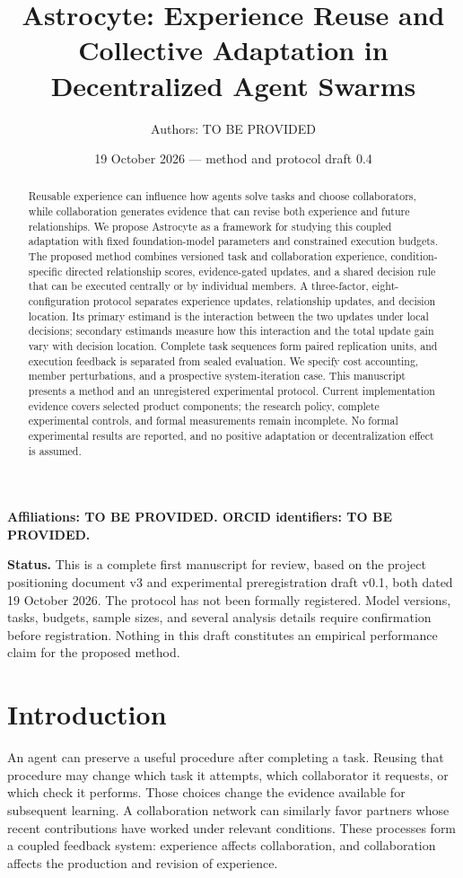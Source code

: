 \documentclass[
  english,
  11pt,
]{article}
\title{Astrocyte: Experience Reuse and Collective Adaptation in
Decentralized Agent Swarms}
\author{Authors: TO BE PROVIDED}
\date{19 October 2026 --- method and protocol draft 0.4}
\begin{document}
\maketitle
\begin{abstract}
Reusable experience can influence how agents solve tasks and choose
collaborators, while collaboration generates evidence that can revise
both experience and future relationships. We propose Astrocyte as a
framework for studying this coupled adaptation with fixed
foundation-model parameters and constrained execution budgets. The
proposed method combines versioned task and collaboration experience,
condition-specific directed relationship scores, evidence-gated updates,
and a shared decision rule that can be executed centrally or by
individual members. A three-factor, eight-configuration protocol
separates experience updates, relationship updates, and decision
location. Its primary estimand is the interaction between the two
updates under local decisions; secondary estimands measure how this
interaction and the total update gain vary with decision location.
Complete task sequences form paired replication units, and execution
feedback is separated from sealed evaluation. We specify cost
accounting, member perturbations, and a prospective system-iteration
case. This manuscript presents a method and an unregistered experimental
protocol. Current implementation evidence covers selected product
components; the research policy, complete experimental controls, and
formal measurements remain incomplete. No formal experimental results
are reported, and no positive adaptation or decentralization effect is
assumed.
\end{abstract}

\textbf{Affiliations: TO BE PROVIDED. ORCID identifiers: TO BE
PROVIDED.}

\textbf{Status.} This is a complete first manuscript for review, based
on the project positioning document v3 and experimental preregistration
draft v0.1, both dated 19 October 2026. The protocol has not been
formally registered. Model versions, tasks, budgets, sample sizes, and
several analysis details require confirmation before registration.
Nothing in this draft constitutes an empirical performance claim for the
proposed method.

\section{Introduction}\label{introduction}

An agent can preserve a useful procedure after completing a task.
Reusing that procedure may change which task it attempts, which
collaborator it requests, or which check it performs. Those choices
change the evidence available for subsequent learning. A collaboration
network can similarly favor partners whose recent contributions have
worked under relevant conditions. These processes form a coupled
feedback system: experience affects collaboration, and collaboration
affects the production and revision of experience.
\end{document}
